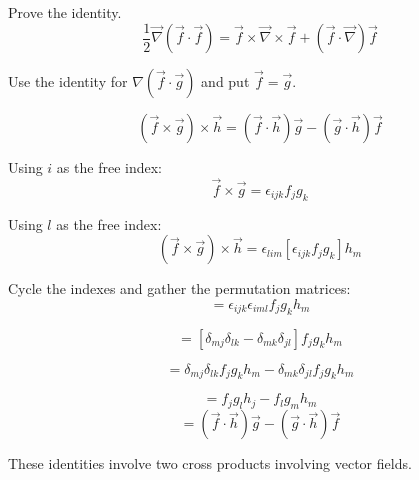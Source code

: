 \begin{question}
Prove the identity.
$$\frac{1}{2} \vec{\nabla}(\vec{f}\cdot\vec{f}) = \vec{f} \times \vec{\nabla}\times\vec{f} + (\vec{f}\cdot \vec{\nabla})\vec{f}$$
\end{question}
\begin{solution}[print]
Use the identity for $\nabla(\vec{f}\cdot\vec{g})$ and put $\vec{f} = \vec{g}$.
\end{solution}


\begin{question}
$$(\vec{f}\times\vec{g})\times\vec{h} = (\vec{f}\cdot\vec{h}) \vec{g} - (\vec{g}\cdot\vec{h}) \vec{f}$$
\end{question}
\begin{solution}[print]
Using $i$ as the free index:
$$ \vec{f} \times \vec{g} = \epsilon_{ijk} f_j g_k $$

Using $l$ as the free index:
$$ \left( \vec{f} \times \vec{g} \right) \times \vec{h} = \epsilon_{lim} \left[ \epsilon_{ijk} f_j g_k \right] h_m $$

Cycle the indexes and gather the permutation matrices:
$$ = \epsilon_{ijk} \epsilon_{iml} f_j g_k h_m $$

$$ = \left[ \delta_{mj} \delta_{lk} - \delta_{mk} \delta_{jl} \right] f_j g_k h_m $$

$$ = \delta_{mj} \delta_{lk} f_j g_k h_m - \delta_{mk} \delta_{jl} f_j g_k h_m $$

$$ = f_j g_l h_j - f_l g_m h_m $$
$$ = \left( \vec{f} \cdot \vec{h} \right) \vec{g} - \left( \vec{g} \cdot \vec{h} \right) \vec{f} $$

\end{solution}


These identities involve two cross products involving vector fields.


